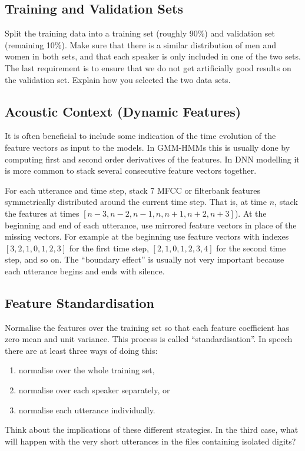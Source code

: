 \documentclass{nada-ten}
\begin{document}

\subsection{Training and Validation Sets}
Split the training data into a training set (roughly 90\%) and validation set (remaining 10\%).
Make sure that there is a similar distribution of men and women in both sets, and that each speaker is only included in one of the two sets. The last requirement is to ensure that we do not get artificially good results on the validation set. Explain how you selected the two data sets.

\subsection{Acoustic Context (Dynamic Features)}
\label{sec:dynamicfeatures}
It is often beneficial to include some indication of the time evolution of the feature vectors as input to the models. In GMM-HMMs this is usually done by computing first and second order derivatives of the features. In DNN modelling it is more common to stack several consecutive feature vectors together.

For each utterance and time step, stack 7 MFCC or filterbank features symmetrically distributed around the current time step. That is, at time $n$, stack the features at times $[n-3, n-2, n-1, n, n+1, n+2, n+3]$). At the beginning and end of each utterance, use mirrored feature vectors in place of the missing vectors. For example at the beginning use feature vectors with indexes $[3, 2, 1, 0, 1, 2, 3]$ for the first time step, $[2, 1, 0, 1, 2, 3, 4]$ for the second time step, and so on. The ``boundary effect'' is usually not very important because each utterance begins and ends with silence.

\subsection{Feature Standardisation}
Normalise the features over the training set so that each feature coefficient has zero mean and unit variance. This process is called ``standardisation''. In speech there are at least three ways of doing this:
\begin{enumerate}
\item normalise over the whole training set,
\item normalise over each speaker separately, or
\item normalise each utterance individually.
\end{enumerate}
Think about the implications of these different strategies. In the third case, what will happen with the very short utterances in the files containing isolated digits?
\end{document}
